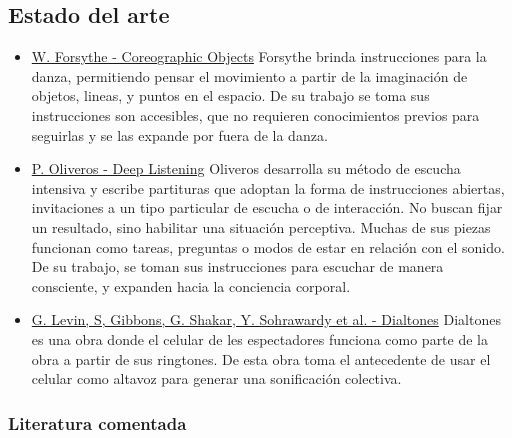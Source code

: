 \documentclass[spanish]{report}
\begin{document}
\subsection{Estado del arte}
\begin{itemize}
    \item \underline{W. Forsythe - Coreographic Objects}
    Forsythe brinda instrucciones para la danza, permitiendo pensar el movimiento a partir de la imaginación de objetos, lineas, y puntos en el espacio. 
    De su trabajo se toma sus instrucciones son accesibles, que no requieren conocimientos previos para seguirlas y se las expande por fuera de la danza.


    \item \underline{P. Oliveros - Deep Listening}
    Oliveros desarrolla su método de escucha intensiva y escribe partituras que adoptan la forma de instrucciones abiertas, invitaciones a un tipo particular de escucha o de interacción. No buscan fijar un resultado, sino habilitar una situación perceptiva. Muchas de sus piezas funcionan como tareas, preguntas o modos de estar en relación con el sonido.
    De su trabajo, se toman sus instrucciones para escuchar de manera consciente, y expanden hacia la conciencia corporal.

    \item \underline{G. Levin, S, Gibbons, G. Shakar, Y. Sohrawardy et al. - Dialtones}
    Dialtones es una obra donde el celular de les espectadores funciona como parte de la obra a partir de sus ringtones.
    De esta obra toma el antecedente de usar el celular como altavoz para generar una sonificación colectiva. 

\end{itemize}


\subsubsection{Literatura comentada}
\end{document}
